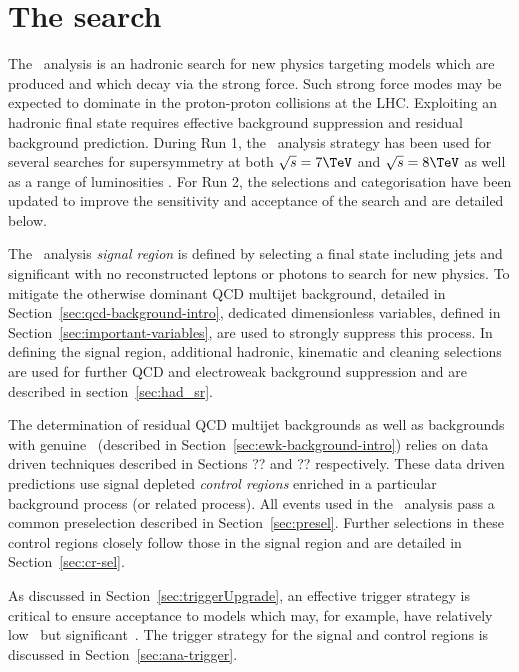 \chapter{The \alphat search}

The \alphat~analysis is an hadronic search for new physics 
targeting models which are produced and which decay via the strong force.
Such strong force modes may be expected to dominate in the proton-proton collisions 
at the LHC. Exploiting an hadronic final state requires effective 
background suppression and residual background prediction. During Run 1, the \alphat~analysis 
strategy has been used for several searches for supersymmetry at
both $\sqrt{s} = 7 \TeV$ and $\sqrt{s} = 8 \TeV$ as well as a range of luminosities
\cite{alphaT1,alphaT2,alphaT3,alphaT4}. For Run 2, the selections and categorisation 
have been updated to improve the sensitivity and acceptance of the search and are detailed below.

The \alphat~analysis \emph{signal region} is defined by selecting a final state 
including jets and significant \met with no reconstructed leptons or photons
to search for new physics. To mitigate the otherwise dominant QCD multijet background, 
detailed in Section~\ref{sec:qcd-background-intro}, dedicated dimensionless variables, 
defined in Section~\ref{sec:important-variables}, are used to strongly suppress this process.
In defining the signal region, additional hadronic, kinematic and cleaning selections 
are used for further QCD and electroweak background suppression and are described in 
section~\ref{sec:had_sr}.

The determination of residual QCD multijet backgrounds as well as backgrounds with 
genuine \met~(described in Section~\ref{sec:ewk-background-intro}) relies on data driven techniques 
described in Sections ?? and ?? respectively. These data driven predictions use signal 
depleted \emph{control regions} enriched in a particular
background process (or related process). All events used in the \alphat~analysis pass
a common preselection described in Section~\ref{sec:presel}. Further selections in
these control regions closely follow those in the signal region and are detailed in 
Section~\ref{sec:cr-sel}.

As discussed in Section~\ref{sec:triggerUpgrade}, an effective trigger strategy is 
critical to ensure acceptance to models which may, for example, have relatively low
\scalht~but significant~\mht. The trigger strategy for the signal and control regions
is discussed in Section~\ref{sec:ana-trigger}.

